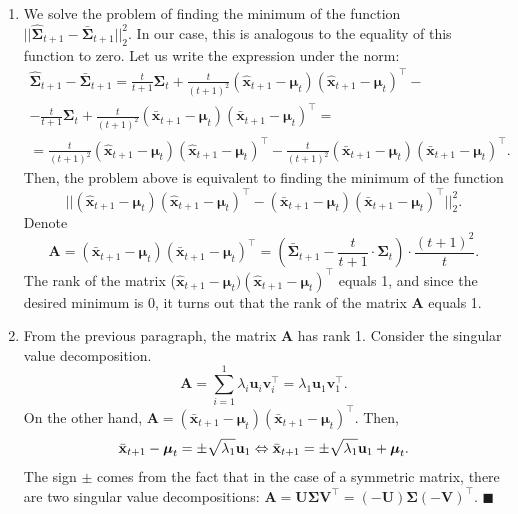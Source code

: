 \documentclass[12pt]{article}
\begin{document}
{\begin{enumerate}
	\item We solve the problem of finding the minimum of the function $||\hat{\mathbf{\Sigma}}_{t+1} - \bar{\mathbf{\Sigma}}_{t+1}||_2^2$. In our case, this is analogous to the equality of this function to zero. Let us write the expression under the norm:
	\begin{gather*}
		\hat{\mathbf{\Sigma}}_{t+1} - \bar{\mathbf{\Sigma}}_{t+1} = \frac{t}{t+1}\mathbf{\Sigma}_t + \frac{t}{(t+1)^2}(\hat{\mathbf{x}}_{t+1}-\boldsymbol{\mu}_t)(\hat{\mathbf{x}}_{t+1}-\boldsymbol{\mu}_t)^\intercal -\\- \frac{t}{t+1}\mathbf{\Sigma}_t + \frac{t}{(t+1)^2}(\bar{\mathbf{x}}_{t+1}-\boldsymbol{\mu}_t)(\bar{\mathbf{x}}_{t+1}-\boldsymbol{\mu}_t)^\intercal =\\
		=\frac{t}{(t+1)^2}(\hat{\mathbf{x}}_{t+1}-\boldsymbol{\mu}_t)(\hat{\mathbf{x}}_{t+1}-\boldsymbol{\mu}_t)^\intercal -\frac{t}{(t+1)^2}(\bar{\mathbf{x}}_{t+1}-\boldsymbol{\mu}_t)(\bar{\mathbf{x}}_{t+1}-\boldsymbol{\mu}_t)^\intercal.
 	\end{gather*}
 	Then, the problem above is equivalent to finding the minimum of the function \[||(\hat{\mathbf{x}}_{t+1}-\boldsymbol{\mu}_t)(\hat{\mathbf{x}}_{t+1}-\boldsymbol{\mu}_t)^\intercal-(\bar{\mathbf{x}}_{t+1}-\boldsymbol{\mu}_t)(\bar{\mathbf{x}}_{t+1}-\boldsymbol{\mu}_t)^\intercal||_2^2.\]
 	Denote \[\mathbf{A} = (\bar{\mathbf{x}}_{t+1}-\boldsymbol{\mu}_t)(\bar{\mathbf{x}}_{t+1}-\boldsymbol{\mu}_t)^\intercal = \left(\bar{\mathbf{\Sigma}}_{t+1} - \frac{t}{t+1} \cdot \mathbf{\Sigma}_t \right) \cdot \frac{(t+1)^2}{t}.\]
 	The rank of the matrix ($\hat{\mathbf{x}}_{t+1}-\boldsymbol{\mu}_t)(\hat{\mathbf{x}}_{t+1}-\boldsymbol{\mu}_t)^\intercal$ equals 1, and since the desired minimum is 0, it turns out that the rank of the matrix $\mathbf{A}$ equals 1.
 	
 	\item From the previous paragraph, the matrix $\mathbf{A}$ has rank 1. Consider the singular value decomposition. \[
 		\mathbf{A} = \sum_{i=1}^{1} \lambda_i \mathbf{u}_i \mathbf{v}_i^\intercal = \lambda_1 \mathbf{u}_1 \mathbf{v}_1^\intercal.
 	\]
 	On the other hand, $\mathbf{A} = (\bar{\mathbf{x}}_{t+1}-\boldsymbol{\mu}_t)(\bar{\mathbf{x}}_{t+1}-\boldsymbol{\mu}_t)^\intercal$. Then, \[
 	\bar{\mathbf{x}}_{t+1}-\boldsymbol{\mu}_t = \pm\sqrt{\lambda_1} \mathbf{u}_1 \Leftrightarrow\\
 	\bar{\mathbf{x}}_{t+1} = \pm\sqrt{\lambda_1} \mathbf{u}_1 + \boldsymbol{\mu}_t.
 	\]
 	The sign $\pm$ comes from the fact that in the case of a symmetric matrix, there are two singular value decompositions: $\mathbf{A}=\mathbf{U}\mathbf{\Sigma} \mathbf{V}^\intercal=(-\mathbf{U})\mathbf{\Sigma} (-\mathbf{V})^\intercal$. \hfill$\blacksquare$
\end{enumerate}

}
\end{document}
